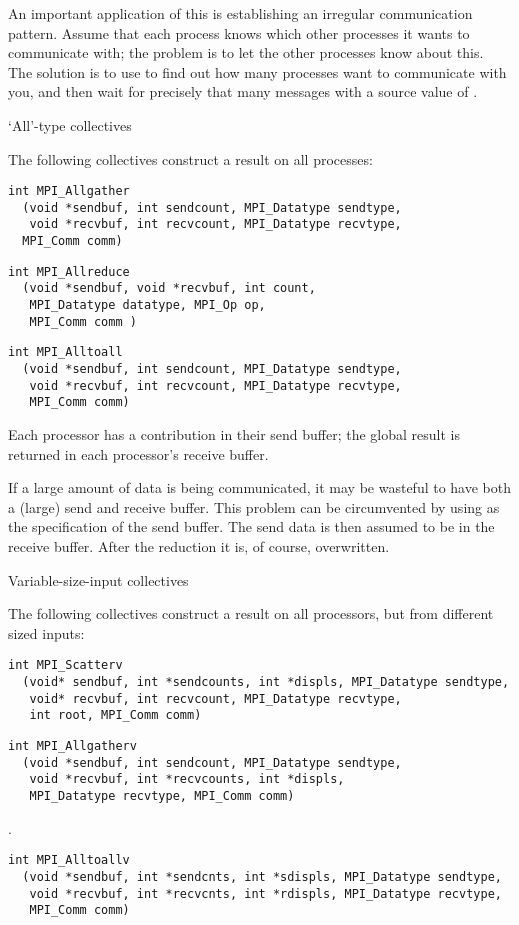 An important application of this is establishing an irregular
communication pattern.  Assume that each process knows which
other processes it wants to communicate with; the problem is to
let the other processes know about this.
The solution is to use  to find out how many processes
want to communicate with you, and then wait for precisely that many messages
with a source value of .

 {`All'-type collectives}

The following collectives construct a result on all processes:
\begin{verbatim}
int MPI_Allgather
  (void *sendbuf, int sendcount, MPI_Datatype sendtype, 
   void *recvbuf, int recvcount, MPI_Datatype recvtype, 
  MPI_Comm comm)
\end{verbatim}
%
\begin{verbatim}
int MPI_Allreduce 
  (void *sendbuf, void *recvbuf, int count, 
   MPI_Datatype datatype, MPI_Op op, 
   MPI_Comm comm )
\end{verbatim}
%
\begin{verbatim}
int MPI_Alltoall
  (void *sendbuf, int sendcount, MPI_Datatype sendtype, 
   void *recvbuf, int recvcount, MPI_Datatype recvtype, 
   MPI_Comm comm)
\end{verbatim}
Each processor has a contribution in their send buffer; the global result
is returned in each processor's receive buffer.

If a large amount of data is being communicated, it may be wasteful to 
have both a (large) send and receive buffer.
This problem can be circumvented by using 
as the specification of the send buffer. The send data is then
assumed to be in the receive buffer. After the reduction it is, of course,
overwritten.

 {Variable-size-input collectives}

The following collectives construct a result on all 
processors, but from different sized inputs:
%
\begin{verbatim}
int MPI_Scatterv
  (void* sendbuf, int *sendcounts, int *displs, MPI_Datatype sendtype, 
   void* recvbuf, int recvcount, MPI_Datatype recvtype, 
   int root, MPI_Comm comm)
\end{verbatim}
\begin{verbatim}
int MPI_Allgatherv
  (void *sendbuf, int sendcount, MPI_Datatype sendtype, 
   void *recvbuf, int *recvcounts, int *displs, 
   MPI_Datatype recvtype, MPI_Comm comm)
\end{verbatim}
%
.
\begin{verbatim}
int MPI_Alltoallv
  (void *sendbuf, int *sendcnts, int *sdispls, MPI_Datatype sendtype, 
   void *recvbuf, int *recvcnts, int *rdispls, MPI_Datatype recvtype,
   MPI_Comm comm)
\end{verbatim}

